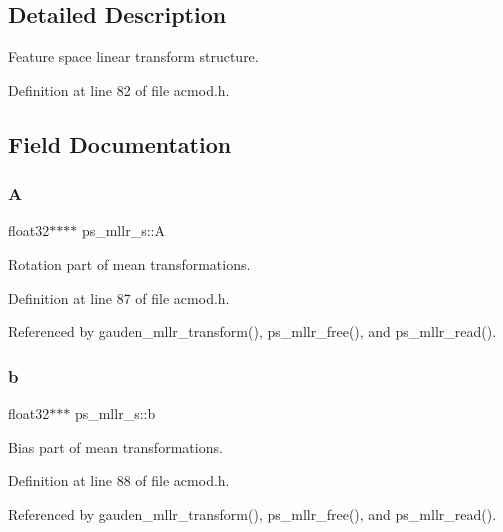 \subsection{Detailed Description}
Feature space linear transform structure. 

Definition at line 82 of file acmod.\+h.



\subsection{Field Documentation}
\mbox{\label{structps__mllr__s_a4cfa5d4c6637282b947b525a673cc3d0}} 
\subsubsection{A}
{\footnotesize\ttfamily float32$\ast$$\ast$$\ast$$\ast$ ps\+\_\+mllr\+\_\+s\+::A}



Rotation part of mean transformations. 



Definition at line 87 of file acmod.\+h.



Referenced by gauden\+\_\+mllr\+\_\+transform(), ps\+\_\+mllr\+\_\+free(), and ps\+\_\+mllr\+\_\+read().

\mbox{\label{structps__mllr__s_a65430ba654d0af5e508715de24077f2d}} 
\subsubsection{b}
{\footnotesize\ttfamily float32$\ast$$\ast$$\ast$ ps\+\_\+mllr\+\_\+s\+::b}



Bias part of mean transformations. 



Definition at line 88 of file acmod.\+h.



Referenced by gauden\+\_\+mllr\+\_\+transform(), ps\+\_\+mllr\+\_\+free(), and ps\+\_\+mllr\+\_\+read().

\mbox{\label{structps__mllr__s_a745c4b69be55cef8629abab02f474bb9}} 
